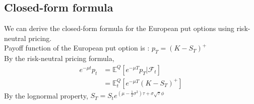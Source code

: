 \subsection{Closed-form formula}
We can derive the closed-form formula for the European put options using risk-neutral pricing.\\
Payoff function of the European put option is : $p_{T} = (K - S_{T})^{+}$\\
By the risk-neutral pricing formula,
\begin{equation*}
\begin{split}
e^{-\mu t}p_{t}
&= \mathbb{E}^{Q}[e^{-\mu T}p_{T} | \mathcal{F}_{t}]\\
&= \mathbb{E}_{t}^{Q}[e^{-\mu T}(K - S_{T})^{+}]
\end{split}
\end{equation*}
By the lognormal property, \quad
$S_{T} = S_{t}e^{(\mu - \frac{1}{2}\sigma^{2})\tau + \sigma\sqrt{\tau}\phi}$
